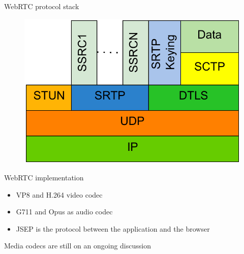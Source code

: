 \documentclass[first=red,second=purple,logo=yellowexc]{aaltoslides}
\begin{document}

\begin{frame}{WebRTC protocol stack}

\begin{figure}[h]
  \centering
  \includegraphics[width=1\textwidth]{protocolStack.pdf}
\end{figure}

\end{frame}

\begin{frame}{WebRTC implementation}

\begin{itemize}
\item VP8 and H.264 video codec
\item G711 and Opus as audio codec
\item {\color{blue} JSEP} is the protocol between the application and the browser
\end{itemize}
\alert{Media codecs are still on an ongoing discussion}
\end{frame}

\end{document}
